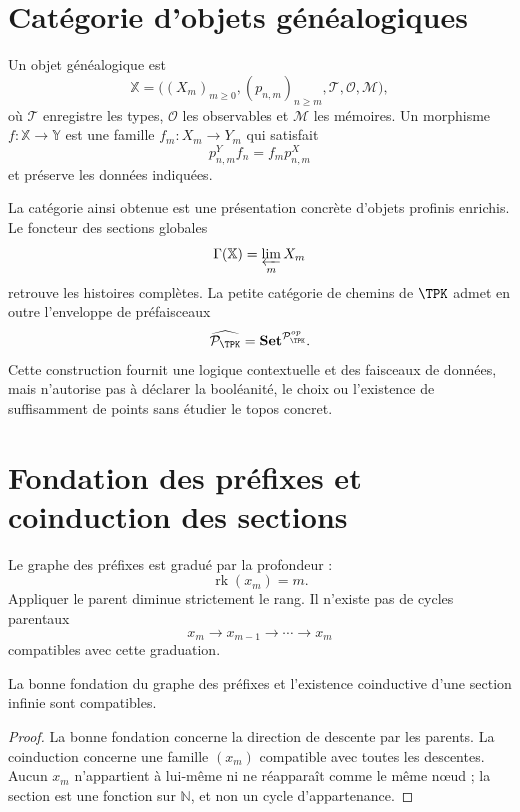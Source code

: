 \section{Catégorie d'objets généalogiques}

\begin{definition}
Un objet généalogique est
\[
  \mathbb X=
  \bigl((X_m)_{m\ge0},(p_{n,m})_{n\ge m},
  \mathcal T,\mathcal O,\mathcal M\bigr),
\]
où \(\mathcal T\) enregistre les types, \(\mathcal O\) les observables et
\(\mathcal M\) les mémoires. Un morphisme
\(f:\mathbb X\to\mathbb Y\) est une famille \(f_m:X_m\to Y_m\) qui satisfait
\[
  p^Y_{n,m}f_n=f_mp^X_{n,m}
\]
et préserve les données indiquées.
\end{definition}

La catégorie ainsi obtenue est une présentation concrète d'objets
profinis enrichis. Le foncteur des sections globales
\[
  \Gamma(\mathbb X)=\varprojlim_mX_m
\]
retrouve les histoires complètes. La petite catégorie de chemins de
\(\TPK\) admet en outre l'enveloppe de préfaisceaux
\[
  \widehat{\mathcal P_{\TPK}}
  =
  \mathbf{Set}^{\mathcal P_{\TPK}^{op}}.
\]
Cette construction fournit une logique contextuelle et des faisceaux de données, mais
n'autorise pas à déclarer la booléanité, le choix ou l'existence de suffisamment de points sans étudier
le topos concret.

\section{Fondation des préfixes et coinduction des sections}

Le graphe des préfixes est gradué par la profondeur :
\[
  \operatorname{rk}(x_m)=m.
\]
Appliquer le parent diminue strictement le rang. Il n'existe pas de cycles
parentaux
\[
  x_m\to x_{m-1}\to\cdots\to x_m
\]
compatibles avec cette graduation.

\begin{proposition}
La bonne fondation du graphe des préfixes et l'existence coinductive d'une
section infinie sont compatibles.
\end{proposition}

\begin{proof}
La bonne fondation concerne la direction de descente par les parents. La
coinduction concerne une famille \((x_m)\) compatible avec toutes les
descentes. Aucun \(x_m\) n'appartient à lui-même ni ne réapparaît comme le même
nœud ; la section est une fonction sur \(\mathbb N\), et non un cycle
d'appartenance.
\end{proof}

